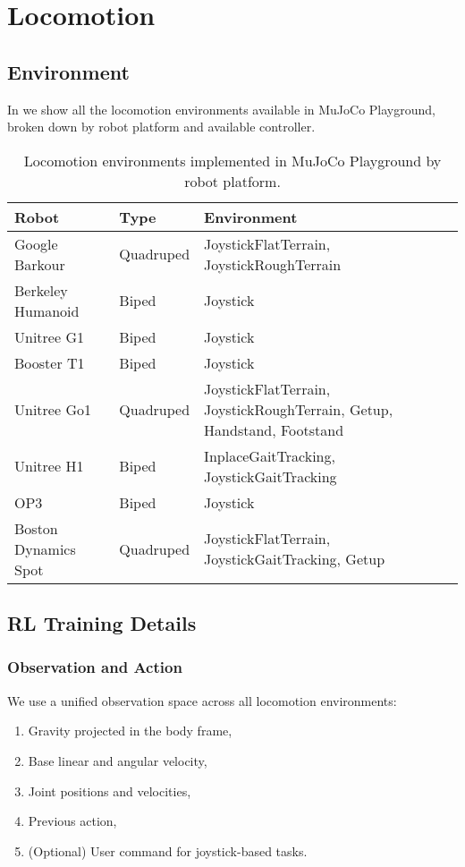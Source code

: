 \section{Locomotion}
\label{sec:appendix_locomotion}

\subsection{Environment}
\label{sec:appendix_locomotion_env}

In  we show all the locomotion environments available in MuJoCo Playground, broken down by robot platform and available controller.

\begin{table*}[!ht]
\centering
\begin{tabular}{|l|l|p{10cm}|} %
\hline
\textbf{Robot} & \textbf{Type} & \textbf{Environment} \\ \hline
Google Barkour     & Quadruped      & JoystickFlatTerrain, JoystickRoughTerrain \\ \hline
Berkeley Humanoid  & Biped         & Joystick \\ \hline
Unitree G1      & Biped     & Joystick \\ \hline
Booster T1      & Biped     & Joystick \\ \hline
Unitree Go1      & Quadruped     & JoystickFlatTerrain, JoystickRoughTerrain, Getup, \mbox{Handstand,} Footstand \\ \hline
Unitree H1 & Biped & InplaceGaitTracking, JoystickGaitTracking  \\ \hline
OP3 & Biped & Joystick \\ \hline
Boston Dynamics Spot & Quadruped & JoystickFlatTerrain, JoystickGaitTracking, Getup \\ \hline
\hline
\end{tabular}
\caption{Locomotion environments implemented in MuJoCo Playground by robot platform.}
\label{tab:locomotion_envs}
\end{table*}

\subsection{RL Training Details}

\subsubsection{Observation and Action}
We use a unified observation space across all locomotion environments:
\begin{enumerate}[label=(\alph*)]
    \item Gravity projected in the body frame,
    \item Base linear and angular velocity,
    \item Joint positions and velocities,
    \item Previous action,
    \item (Optional) User command for joystick-based tasks.
\end{enumerate}

